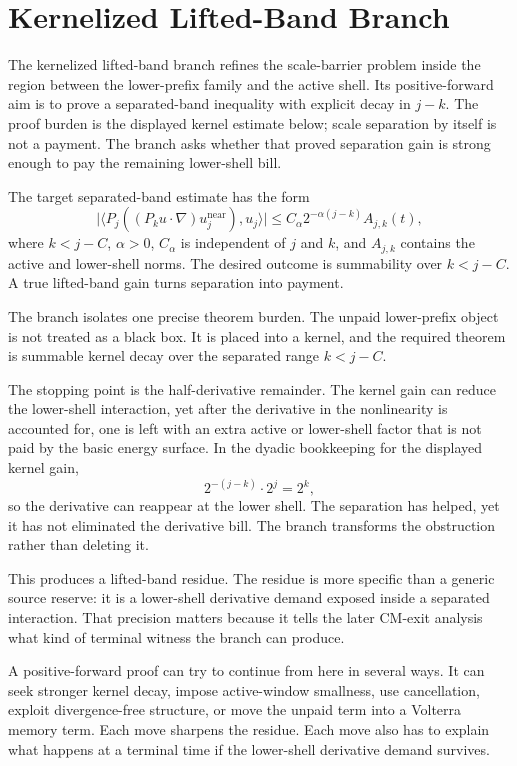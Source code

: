 \section{Kernelized Lifted-Band Branch}
\label{sec:kernelized-lifted-band-branch}

The kernelized lifted-band branch refines the scale-barrier problem inside the
region between the lower-prefix family and the active shell. Its positive-forward
aim is to prove a separated-band inequality with explicit decay in \(j-k\).
The proof burden is the displayed kernel estimate below; scale separation by
itself is not a payment. The branch asks whether that proved separation gain is
strong enough to pay the remaining lower-shell bill.

The target separated-band estimate has the form
\[
  \big|\langle P_j((P_k u\cdot\nabla)u^{\mathrm{near}}_j),u_j\rangle\big|
  \le C_{\alpha}2^{-\alpha(j-k)} A_{j,k}(t),
\]
where \(k<j-C\), \(\alpha>0\), \(C_\alpha\) is independent of \(j\) and \(k\),
and \(A_{j,k}\) contains the active and lower-shell norms. The desired outcome
is summability over \(k<j-C\). A true lifted-band gain turns separation into
payment.

The branch isolates one precise theorem burden. The unpaid lower-prefix object is
not treated as a black box. It is placed into a kernel, and the required theorem
is summable kernel decay over the separated range \(k<j-C\).

The stopping point is the half-derivative remainder. The kernel gain can reduce
the lower-shell interaction, yet after the derivative in the nonlinearity is
accounted for, one is left with an extra active or lower-shell factor that is not
paid by the basic energy surface. In the dyadic bookkeeping for the displayed
kernel gain,
\[
  2^{-(j-k)}\cdot 2^j = 2^k,
\]
so the derivative can reappear at the lower shell. The separation has helped, yet
it has not eliminated the derivative bill. The branch transforms the obstruction
rather than deleting it.

This produces a lifted-band residue. The residue is more specific than a generic
source reserve: it is a lower-shell derivative demand exposed inside a separated
interaction. That precision matters because it tells the later CM-exit analysis
what kind of terminal witness the branch can produce.

A positive-forward proof can try to continue from here in several ways. It can
seek stronger kernel decay, impose active-window smallness, use cancellation,
exploit divergence-free structure, or move the unpaid term into a Volterra memory
term. Each move sharpens the residue. Each move also has to explain what
happens at a terminal time if the lower-shell derivative demand survives.

